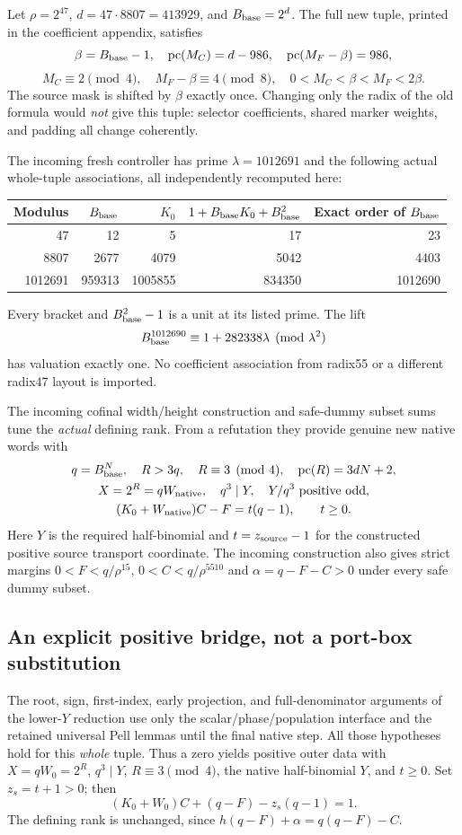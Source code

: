 Let $\rho=2^{47}$, $d=47\cdot8807=413929$, and $B_{\rm base}=2^d$.
The full new tuple, printed in the coefficient appendix, satisfies
\[
 \beta=B_{\rm base}-1,\quad
 \operatorname{pc}(M_C)=d-986,\quad
 \operatorname{pc}(M_F-\beta)=986,
\]
\[
 M_C\equiv2\pmod4,\quad M_F-\beta\equiv4\pmod8,
 \quad0<M_C<\beta<M_F<2\beta.
\]
The source mask is shifted by $\beta$ exactly once. Changing only the radix
of the old formula would \emph{not} give this tuple: selector coefficients,
shared marker weights, and padding all change coherently.

The incoming fresh controller has prime $\lambda=1012691$ and the following
actual whole-tuple associations, all independently recomputed here:
\begin{center}
\begin{tabular}{r|rrrr}
Modulus & $B_{\rm base}$ & $K_0$ & $1+B_{\rm base}K_0+B_{\rm base}^2$
& Exact order of $B_{\rm base}$\\\hline
47&12&5&17&23\\
8807&2677&4079&5042&4403\\
1012691&959313&1005855&834350&1012690
\end{tabular}
\end{center}
Every bracket and $B_{\rm base}^2-1$ is a unit at its listed prime. The lift
\[
 B_{\rm base}^{1012690}\equiv1+282338\lambda\pmod{\lambda^2}
\]
has valuation exactly one. No coefficient association from radix55 or a
different radix47 layout is imported.

The incoming cofinal width/height construction and safe-dummy subset sums tune
the \emph{actual} defining rank. From a refutation they provide genuine new
native words with
\begin{gather*}
 q=B_{\rm base}^{N},\quad R>3q,\quad R\equiv3\pmod4,
 \quad\operatorname{pc}(R)=3dN+2,\\
 X=2^R=qW_{\rm native},\quad q^3\mid Y,
 \quad Y/q^3\text{ positive odd},\\
 (K_0+W_{\rm native})C-F=t(q-1),\qquad t\ge0.
\end{gather*}
Here $Y$ is the required half-binomial and $t=z_{\rm source}-1$ for the
constructed positive source transport coordinate. The incoming construction
also gives strict margins $0<F<q/\rho^{15}$,
$0<C<q/\rho^{5510}$ and $\alpha=q-F-C>0$ under every safe dummy subset.

\subsection{An explicit positive bridge, not a port-box substitution}
The root, sign, first-index, early projection, and full-denominator arguments
of the lower-$Y$ reduction use only the scalar/phase/population interface and
the retained universal Pell lemmas until the final native step. All those
hypotheses hold for this \emph{whole} tuple. Thus a zero yields positive outer
data with $X=qW_0=2^R$, $q^3\mid Y$, $R\equiv3\pmod4$, the native
half-binomial $Y$, and $t\ge0$. Set $z_s=t+1>0$; then
\[
 (K_0+W_0)C+(q-F)-z_s(q-1)=1.
\]
The defining rank is unchanged, since
$h(q-F)+\alpha=q(q-F)-C$.


